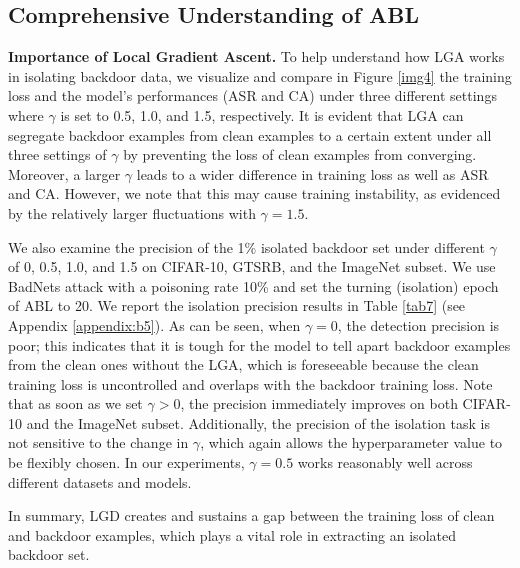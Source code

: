 \subsection{Comprehensive Understanding of ABL}\label{sec:4.2}
\noindent\textbf{Importance of Local Gradient Ascent.} To help understand how LGA works in isolating backdoor data, we visualize and compare in Figure \ref{img4} the training loss and the model's performances (ASR and CA) under three different settings where $\gamma$ is set to 0.5, 1.0, and 1.5, respectively. It is evident that LGA can segregate backdoor examples from clean examples to a certain extent under all three settings of $\gamma$ by preventing the loss of clean examples from converging. Moreover, a larger $\gamma$ leads to a wider difference in training loss as well as ASR and CA. However, we note that this may cause training instability, as evidenced by the relatively larger fluctuations with $\gamma=1.5$.

We also examine the precision of the 1\% isolated backdoor set under different $\gamma$ of 0, 0.5, 1.0, and 1.5 on CIFAR-10, GTSRB, and the ImageNet subset. We use BadNets attack with a poisoning rate 10\% and set the turning (isolation) epoch of ABL to 20. We report the isolation precision results in Table \ref{tab7} (see Appendix \ref{appendix:b5}). As can be seen, when $\gamma = 0$, the detection precision is poor; this indicates that it is tough for the model to tell apart backdoor examples from the clean ones without the LGA, which is foreseeable because the clean training loss is uncontrolled and overlaps with the backdoor training loss. Note that as soon as we set $\gamma > 0$, the precision immediately improves on both CIFAR-10 and the ImageNet subset. Additionally, the precision of the isolation task is not sensitive to the change in $\gamma$, which again allows the hyperparameter value to be flexibly chosen. In our experiments, $\gamma=0.5$ works reasonably well across different datasets and models.

In summary, LGD creates and sustains a gap between the training loss of clean and backdoor examples, which plays a vital role in extracting an isolated backdoor set.

